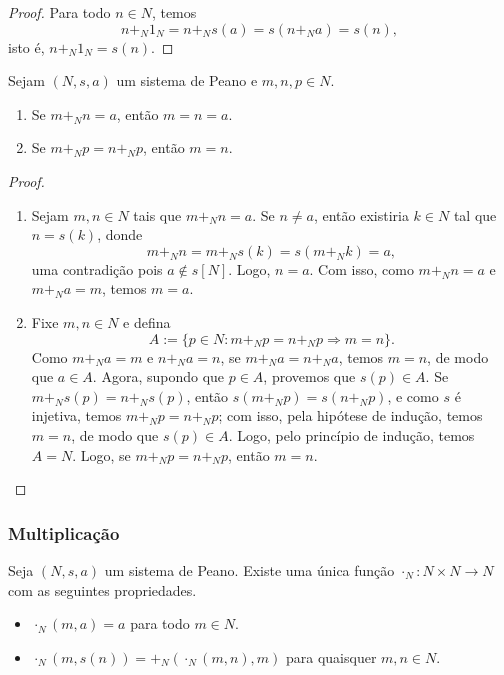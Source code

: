 \begin{proof}
    Para todo $n \in N$, temos
        \[
            n +_N 1_N = n +_N s(a) = s(n +_N a) = s(n),
        \]
    isto é, $n +_N 1_N = s(n)$. \blackproof
\end{proof}

\begin{proposition}
    Sejam $(N,s,a)$ um sistema de Peano e $m,n,p \in N$.
        \begin{enumerate}[leftmargin=*, align=left, label=\textbf{(\alph*)}]
            \item Se $m +_N n = a$, então $m = n = a$.
            \item Se $m +_N p = n +_N p$, então $m=n$.
        \end{enumerate}
\end{proposition}

\begin{proof}
    \leavevmode
        \begin{enumerate}[leftmargin=*, align=left, label=\textbf{(\alph*)}]
            \item Sejam $m,n \in N$ tais que $m +_N n = a$. Se $n \neq a$, então existiria $k \in N$ tal que $n=s(k)$, donde
                \[
                    m +_N n = m +_N s(k) = s(m +_N k) = a,
                \]
            uma contradição pois $a \notin s[N]$. Logo, $n=a$. Com isso, como $m +_N n = a$ e $m +_N a = m$, temos $m = a$. \blackproof
            \item Fixe $m,n \in N$ e defina
                \[
                    A := \{p \in N : m +_N p = n +_N p \Rightarrow m=n\}.    
                \]
            Como $m +_N a = m$ e $n +_N a = n$, se $m +_N a = n +_N a$, temos $m = n$, de modo que $a \in A$. Agora, supondo que $p \in A$, provemos que $s(p) \in A$. Se $m +_N s(p) = n +_N s(p)$, então $s(m +_N p) = s(n +_N p)$, e como $s$ é injetiva, temos $m +_N p = n +_N p$; com isso, pela hipótese de indução, temos $m = n$, de modo que $s(p) \in A$. Logo, pelo princípio de indução, temos $A = N$. Logo, se $m +_N p = n +_N p$, então $m=n$. \blackproof
        \end{enumerate}
\end{proof}

\subsubsection{Multiplicação}

\begin{corollary}
    Seja $(N,s,a)$ um sistema de Peano. Existe uma única função $\cdot_N : N \times N \to N$ com as seguintes propriedades.
        \begin{itemize}
            \item $\cdot_N (m,a) = a$ para todo $m \in N$.
            \item $\cdot_N (m,s(n)) = +_N (\cdot_N (m,n),m)$ para quaisquer $m,n \in N$.
        \end{itemize}
\end{corollary}


